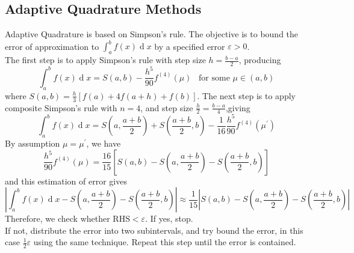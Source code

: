 \documentclass[12pt]{article}
\theoremstyle{definition}
\DeclareMathOperator{\diff}{d}
\begin{document}
\subsection{Adaptive Quadrature Methods}
Adaptive Quadrature is based on Simpson's rule. The objective is to bound the error of approximation to $\int_a^bf(x)\diff x$ by a specified error $\varepsilon>0$.\\
The first step is to apply Simpson's rule with step size $h=\frac{b-a}{2}$, producing
\[
\int_a^bf(x)\diff x = S(a,b)-\frac{h^5}{90}f^{(4)}(\mu)\;\;\;\text{for some }\mu\in(a,b)
\]
where $S(a,b)= \frac{h}{3}[f(a)+4f(a+h)+f(b)]$.
The next step is to apply composite Simpson's rule with $n=4$, and step size $\frac{h}{2}=\frac{b-a}{4}$,giving
\[
\int_a^bf(x)\diff x = S(a,\frac{a+b}{2})+S(\frac{a+b}{2},b)-\frac{1}{16}\frac{h^5}{90}f^{(4)}(\mu^\prime)
\]
By assumption $\mu=\mu^\prime$, we have
\[
\frac{h^5}{90}f^{(4)}(\mu)=\frac{16}{15}[S(a,b)-S(a,\frac{a+b}{2})-S(\frac{a+b}{2},b)]
\]
and this estimation of error gives
\[
\left|\int_a^bf(x)\diff x - S(a,\frac{a+b}{2})-S(\frac{a+b}{2},b)\right|\approx \frac{1}{15}|S(a,b)- S(a,\frac{a+b}{2})-S(\frac{a+b}{2},b)|
\]
Therefore, we check whether $\text{RHS}<\varepsilon$. If yes, stop.\\
If not, distribute the error into two subintervals, and try bound the error, in this case $\frac{1}{2}\varepsilon$ using the same technique. Repeat this step until the error is contained.
\end{document}
